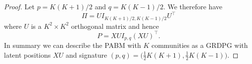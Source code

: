 \documentclass[12pt]{article}
\begin{document}
\begin{proof}
Let $p = K (K + 1) / 2$ and $q = K (K - 1) / 2$. 
We therefore have
\begin{equation} \label{eq:permutation}
\Pi = U I_{K (K + 1) / 2, K (K - 1) / 2} U^\top
\end{equation}
where $U$ is a $K^2 \times K^2$ orthogonal matrix and hence
\begin{equation} \label{eq:pabm-grdpg}
P = X U I_{p, q} (X U)^\top.
\end{equation}
In summary we can describe the PABM with $K$ communities as a GRDPG with latent
positions $X U$ and signature $(p,q) = \bigl( \tfrac{1}{2} K (K + 1) ,
\tfrac{1}{2} K (K - 1)\bigr)$.
\end{proof}
\end{document}
